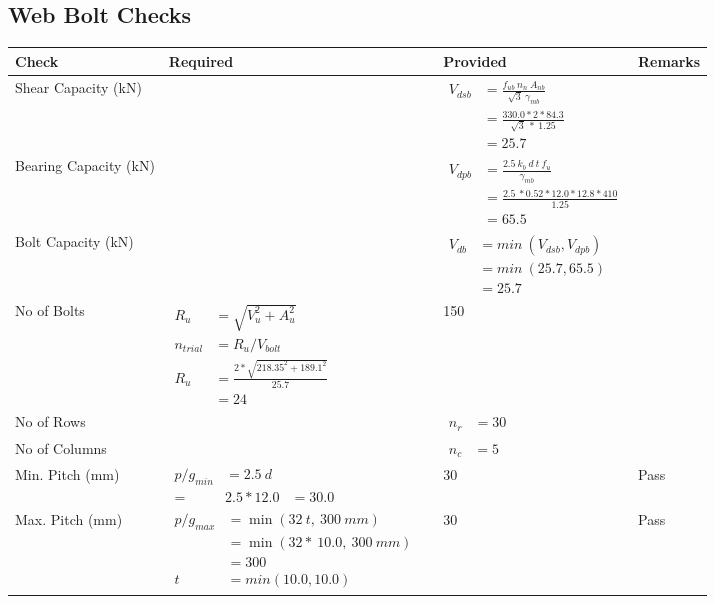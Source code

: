 \documentclass{article}%
\begin{document}
\subsection{Web Bolt Checks}%
\label{subsec:WebBoltChecks}%
\renewcommand{\arraystretch}{1.2}%
\begin{longtable}{|p{3cm}|p{5cm}|p{7.5cm}|p{1.5cm}|}%
\hline%
\rowcolor{OsdagGreen}%
Check&Required&Provided&Remarks\\%
\hline%
\endhead%
\hline%
Shear Capacity (kN)&&$\begin{aligned}V_{dsb} &= \frac{f_{ub} ~n_n~ A_{nb}}{\sqrt{3} ~\gamma_{mb}}\\ &= \frac{330.0*2*84.3}{\sqrt{3}~*~1.25}\\ &= 25.7\end{aligned}$&\\%
\hline%
Bearing Capacity (kN)&&$\begin{aligned}V_{dpb} &= \frac{2.5~ k_b~ d~ t~ f_u}{\gamma_{mb}}\\ &= \frac{2.5~*0.52*12.0*12.8*410}{1.25}\\ &=65.5\end{aligned}$&\\%
\hline%
Bolt Capacity (kN)&&$\begin{aligned}V_{db} &= min~ (V_{dsb}, V_{dpb})\\ &= min~ (25.7,65.5)\\ &=25.7\end{aligned}$&\\%
\hline%
No of Bolts&$\begin{aligned}R_{u} &= \sqrt{V_u^2+A_u^2}\\ n_{trial} &= R_u/ V_{bolt}\\ R_{u} &= \frac{2*\sqrt{218.35^2+189.1^2}}{25.7}\\ &=24\end{aligned}$&150&\\%
\hline%
No of Rows&&$\begin{aligned} n_r &=30\end{aligned}$&\\%
\hline%
No of Columns&&$\begin{aligned} n_c &=5\end{aligned}$&\\%
\hline%
Min. Pitch (mm)&$\begin{aligned}p/g_{min}&= 2.5 ~ d&\\ =&2.5*12.0&=30.0\end{aligned}$&30&Pass\\%
\hline%
Max. Pitch (mm)&$\begin{aligned}p/g_{max} &=\min(32~t,~300~mm)&\\ &=\min(32 *~10.0,~ 300 ~mm)\\&=300\\  t& = min(10.0,10.0)\end{aligned}$&30&Pass\\%

\end{longtable}
\end{document}
